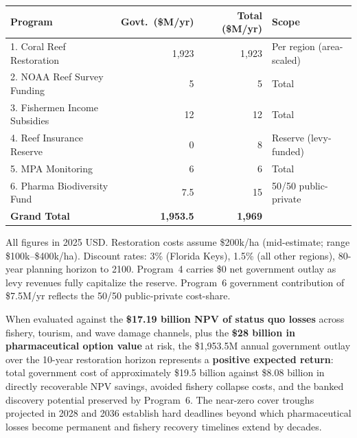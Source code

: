 \documentclass[10pt,letterpaper]{article}
\newcounter{gs}
\begin{document}
\begin{tcolorbox}[title=Total Recommended Annual Funding Package,
  colback=gray!10, colframe=black, fonttitle=\bfseries\large, breakable]
  \begin{center}
  \begin{tabular}{lrrl}
    \toprule
    \textbf{Program} & \textbf{Govt.\ (\$M/yr)} & \textbf{Total (\$M/yr)} & \textbf{Scope} \\
    \midrule
    1. Coral Reef Restoration     & 1,923   & 1,923  & Per region (area-scaled) \\
    2. NOAA Reef Survey Funding   & 5       & 5      & Total \\
    3. Fishermen Income Subsidies & 12      & 12     & Total \\
    4. Reef Insurance Reserve     & 0       & 8      & Reserve (levy-funded) \\
    5. MPA Monitoring             & 6       & 6      & Total \\
    6. Pharma Biodiversity Fund   & 7.5     & 15     & 50/50 public-private \\
    \midrule
    \textbf{Grand Total}          & \textbf{1,953.5} & \textbf{1,969} & \\
    \bottomrule
  \end{tabular}
  \end{center}

  \medskip
  \noindent All figures in 2025 USD. Restoration costs assume \$200k/ha (mid-estimate; range \$100k--\$400k/ha). Discount rates: 3\% (Florida Keys), 1.5\% (all other regions), 80-year planning horizon to 2100. Program~4 carries \$0 net government outlay as levy revenues fully capitalize the reserve. Program~6 government contribution of \$7.5M/yr reflects the 50/50 public-private cost-share.

  \medskip
  \noindent When evaluated against the \textbf{\$17.19 billion NPV of status quo losses} across fishery, tourism, and wave damage channels, plus the \textbf{\$28 billion in pharmaceutical option value} at risk, the \$1,953.5M annual government outlay over the 10-year restoration horizon represents a \textbf{positive expected return}: total government cost of approximately \$19.5 billion against \$8.08 billion in directly recoverable NPV savings, avoided fishery collapse costs, and the banked discovery potential preserved by Program~6. The near-zero cover troughs projected in 2028 and 2036 establish hard deadlines beyond which pharmaceutical losses become permanent and fishery recovery timelines extend by decades.
\end{tcolorbox}
\end{document}
